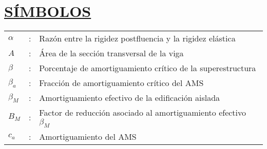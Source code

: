 \section*{\textbf{\underline{SÍMBOLOS}}}

\begin{tabular}{L{0.5 cm}p{0.025 cm}p{12.5 cm}}
    $\alpha$    & : & Razón entre la rigidez postfluencia y la rigidez elástica            \\
    $A$         & : & Área de la sección transversal de la viga                           \\
    $\beta$     & : & Porcentaje de amortiguamiento crítico de la superestructura         \\
    $\beta_{a}$ & : & Fracción de amortiguamiento crítico del AMS                         \\
    $\beta_{M}$ & : & Amortiguamiento efectivo de la edificación aislada                  \\
    $B_{M}$     & : & Factor de reducción asociado al amortiguamiento efectivo   $\beta_{M}$ \\
    $c_{a}$     & : & Amortiguamiento del AMS
\end{tabular}





